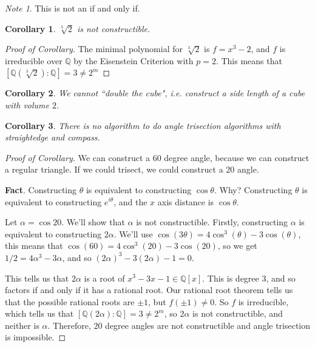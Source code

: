 \documentclass[12pt]{article}
\def\Q{{\mathbb Q}}
\newtheorem{corollary}{Corollary}
\theoremstyle{remark}
\theoremstyle{remark}
\theoremstyle{remark}
\theoremstyle{remark}
\theoremstyle{remark}
\newtheorem*{note}{Note}
\begin{document}
\begin{note}
  This is not an if and only if.
\end{note}


\begin{corollary}
  $\sqrt[3]{2}$ is not constructible.
\end{corollary}

\begin{proof}[Proof of Corollary]
  The minimal polynomial for $\sqrt[3]{2}$ is $f = x^3 - 2$, and $f$ is
  irreducible over $\Q$ by the Eisenstein Criterion with $p = 2$. This means
  that $[\Q(\sqrt[3]{2}) : \Q] = 3 \ne 2^m$
\end{proof}

\begin{corollary}
  We cannot ``double the cube", i.e. construct a side length of a cube with
  volume $2$.
\end{corollary}

\begin{corollary}
  There is no algorithm to do angle trisection algorithms with straightedge and
  compass.
\end{corollary}

\begin{proof}[Proof of Corollary]
  We can construct a $60$ degree angle, because we can construct a regular
  triangle. If we could trisect, we could construct a $20$ angle.

  {\bf Fact}. Constructing $\theta$ is equivalent to constructing $\cos \theta$.
  Why? Constructing $\theta$ is equivalent to constructing $e^{i \theta}$, and
  the $x$ axis distance is $\cos \theta$.

  Let $\alpha = \cos 20$. We'll show that $\alpha$ is not constructible.
  Firstly, constructing $\alpha$ is equivalent to constructing $2\alpha$. We'll
  use $\cos(3 \theta) = 4 \cos^3 (\theta) - 3 \cos(\theta)$, this means that
  $\cos(60) = 4 \cos^3(20) - 3 \cos(20)$, so we get $1/2 = 4 \alpha^3 - 3
  \alpha$, and so $(2 \alpha)^3 - 3 (2\alpha) - 1 = 0$.

  This tells us that $2 \alpha$ is a root of $x^3 - 3x - 1 \in \Q[x]$. This is
  degree $3$, and so factors if and only if it has a rational root. Our rational
  root theorem tells us that the possible rational roots are $\pm 1$, but
  $f(\pm 1) \ne 0$. So $f$ is irreducible, which tells us that $[\Q(2\alpha) :
  \Q] = 3 \ne 2^m$, so $2\alpha$ is not constructible, and neither is $\alpha$.
  Therefore, $20$ degree angles are not constructible and angle trisection is
  impossible.
\end{proof}
\end{document}
